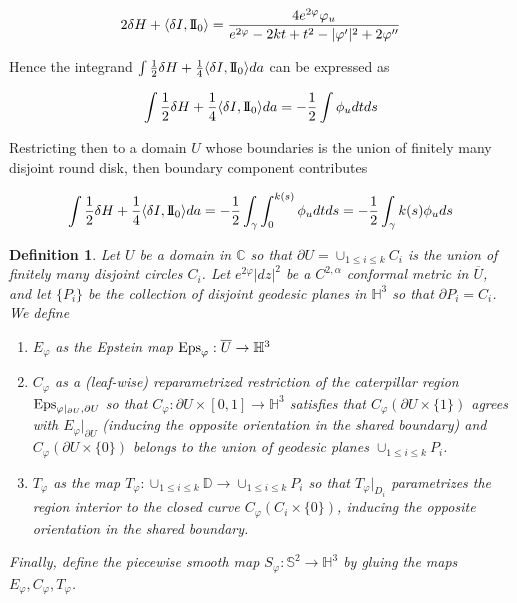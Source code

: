 \documentclass[12pt]{amsart}
\newcommand{\II}{{\rm I}\!{\rm I}}
\newcommand{\Eps}{{\rm Eps}}
\newtheorem{defi}{Definition}[section]
\begin{document}
\[2\delta H + \langle \delta I, \II_0 \rangle = \frac{4 e^{2\varphi} \varphi_u}{e^{2\varphi}-2 k t+t^2-|\varphi'|^2+2 \varphi''} 
\]

Hence the integrand $\int \frac12\delta H + \frac14\langle \delta I, \II_0 \rangle da$ can be expressed as

\[ \int \frac12\delta H + \frac14\langle \delta I, \II_0 \rangle da = -\frac12 \int  \phi_u dtds
\]


Restricting then to a domain $U$ whose boundaries is the union of finitely many disjoint round disk, then boundary component contributes

\begin{equation}\label{eq:WSchlafliCaterpillar}
\int \frac12\delta H + \frac14\langle \delta I, \II_0 \rangle da = -\frac12 \int_\gamma\int_0^{k(s)}  \phi_u dtds = -\frac12 \int_\gamma k(s)\phi_u ds
\end{equation}

\begin{defi}\label{defi:piecewisesphere}
Let $U$ be a domain in $\mathbb{C}$ so that $\partial U=\cup_{1\leq i\leq k}C_i$ is the union of finitely many disjoint circles $C_i$. Let $e^{2\varphi}|dz|^2$ be a $C^{2,\alpha}$ conformal metric in $\overline{U}$, and let $\lbrace P_i\rbrace$ be the collection of disjoint geodesic planes in $\mathbb{H}^3$ so that $\partial P_i=C_i$. We define
\begin{enumerate}
    \item $E_\varphi$ as the Epstein map $\Eps_\varphi : \overline{U}\rightarrow\mathbb{H}^3$
    \item $C_\varphi$ as a (leaf-wise) reparametrized restriction of the caterpillar region $\Eps_{\varphi|_{\partial U},\partial U}$ so that $C_\varphi:\partial U \times [0,1]\rightarrow \mathbb{H}^3$ satisfies that $C_\varphi(\partial U\times\lbrace1\rbrace)$ agrees with $E_\varphi|_{\partial U}$ (inducing the opposite orientation in the shared boundary) and $C_\varphi(\partial U\times\lbrace0\rbrace)$ belongs to the union of geodesic planes $\cup_{1\leq i\leq k} P_i$.
    \item $T_\varphi$ as the map $T_\varphi:\cup_{1\leq i\leq k}\mathbb{D}\rightarrow \cup_{1\leq i\leq k}P_i$ so that $T_\varphi|_{D_i}$ parametrizes the region interior to the closed curve $C_\varphi(C_i \times\lbrace0\rbrace)$, inducing the opposite orientation in the shared boundary.
\end{enumerate}
Finally, define the piecewise smooth map $S_\varphi:\mathbb{S}^2\rightarrow\mathbb{H}^3$ by gluing the maps $E_\varphi,C_\varphi,T_\varphi$. 
\end{defi}
\end{document}
